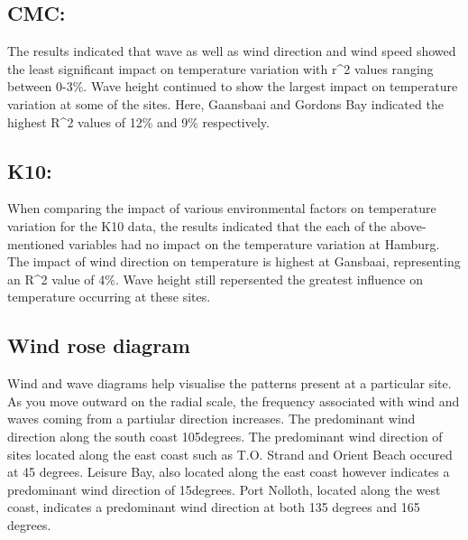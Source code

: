 \documentclass[12pt,A4paper,]{article}
\begin{document}
\subsection{CMC:}\label{cmc}

The results indicated that wave as well as wind direction and wind speed
showed the least significant impact on temperature variation with r\^{}2
values ranging between 0-3\%. Wave height continued to show the largest
impact on temperature variation at some of the sites. Here, Gaansbaai
and Gordons Bay indicated the highest R\^{}2 values of 12\% and 9\%
respectively.

\subsection{K10:}\label{k10}

When comparing the impact of various environmental factors on
temperature variation for the K10 data, the results indicated that the
each of the above-mentioned variables had no impact on the temperature
variation at Hamburg. The impact of wind direction on temperature is
highest at Gansbaai, representing an R\^{}2 value of 4\%. Wave height
still repersented the greatest influence on temperature occurring at
these sites.

\subsection{Wind rose diagram}\label{wind-rose-diagram}

Wind and wave diagrams help visualise the patterns present at a
particular site. As you move outward on the radial scale, the frequency
associated with wind and waves coming from a partiular direction
increases. The predominant wind direction along the south coast
105degrees. The predominant wind direction of sites located along the
east coast such as T.O. Strand and Orient Beach occured at 45 degrees.
Leisure Bay, also located along the east coast however indicates a
predominant wind direction of 15degrees. Port Nolloth, located along the
west coast, indicates a predominant wind direction at both 135 degrees
and 165 degrees.
\end{document}
